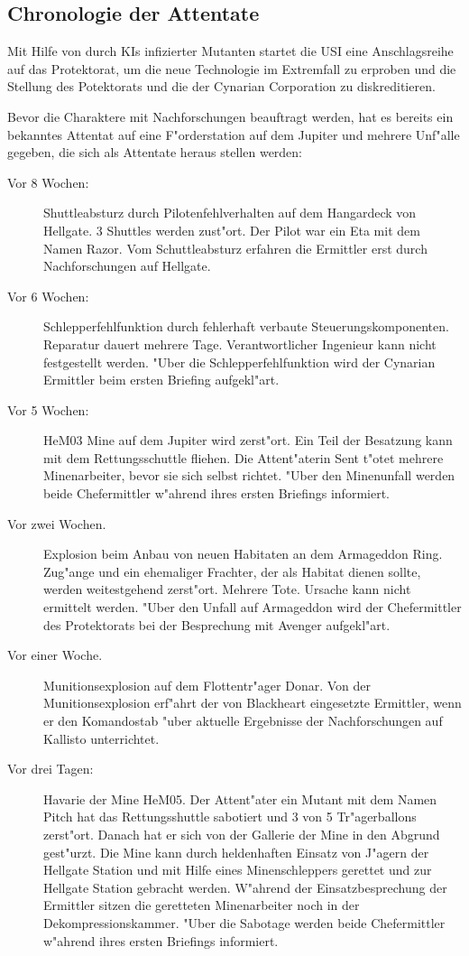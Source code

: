 \subsection{Chronologie der Attentate}

Mit Hilfe von durch KIs infizierter Mutanten startet die USI eine Anschlagsreihe auf das Protektorat, um die neue Technologie im Extremfall zu erproben und die Stellung des Potektorats und die der Cynarian Corporation zu diskreditieren.

Bevor die Charaktere mit Nachforschungen beauftragt werden, hat es bereits ein bekanntes Attentat auf eine F"orderstation auf dem Jupiter und mehrere Unf"alle gegeben, die sich als Attentate heraus stellen werden:

\begin{description}
\item [Vor 8 Wochen:] Shuttleabsturz durch Pilotenfehlverhalten auf dem Hangardeck von Hellgate. 3 Shuttles
      werden zust"ort. Der Pilot war ein Eta mit dem Namen Razor. Vom Schuttleabsturz erfahren die Ermittler erst durch Nachforschungen auf Hellgate.
\item [Vor 6 Wochen:] Schlepperfehlfunktion durch fehlerhaft verbaute Steuerungskomponenten. Reparatur dauert
      mehrere Tage. Verantwortlicher Ingenieur kann nicht festgestellt werden. "Uber die Schlepperfehlfunktion wird der Cynarian Ermittler beim ersten Briefing aufgekl"art.
\item [Vor 5 Wochen:] HeM03 Mine auf dem Jupiter wird zerst"ort. Ein Teil der Besatzung kann mit dem
      Rettungsschuttle fliehen. Die Attent"aterin Sent t"otet mehrere Minenarbeiter, bevor sie sich selbst richtet. "Uber den Minenunfall werden beide Chefermittler w"ahrend ihres ersten Briefings informiert.
\item [Vor zwei Wochen.] Explosion beim Anbau von neuen Habitaten an dem Armageddon Ring. Zug"ange und ein
      ehemaliger Frachter, der als Habitat dienen sollte, werden weitestgehend zerst"ort.  Mehrere Tote. Ursache kann nicht ermittelt werden. "Uber den Unfall auf Armageddon wird der Chefermittler des Protektorats bei der Besprechung mit Avenger aufgekl"art.
\item [Vor einer Woche.] Munitionsexplosion auf dem Flottentr"ager Donar. Von der Munitionsexplosion erf"ahrt der
      von Blackheart eingesetzte Ermittler, wenn er den Komandostab "uber aktuelle Ergebnisse der Nachforschungen auf Kallisto unterrichtet.
\item [Vor drei Tagen:] Havarie der Mine HeM05. Der Attent"ater ein Mutant mit dem Namen Pitch hat das
      Rettungsshuttle sabotiert und 3 von 5 Tr"agerballons zerst"ort. Danach hat er sich von der Gallerie der Mine in den Abgrund gest"urzt. Die Mine kann durch heldenhaften Einsatz von J"agern der Hellgate Station und mit Hilfe eines Minenschleppers gerettet und zur Hellgate Station gebracht werden. W"ahrend der Einsatzbesprechung der Ermittler sitzen die geretteten Minenarbeiter noch in der Dekompressionskammer. "Uber die Sabotage werden beide Chefermittler w"ahrend ihres ersten Briefings informiert.
\end{description}

